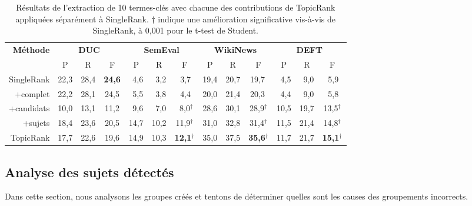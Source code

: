     \begin{table}
      \centering
      \begin{tabular}{@{~}r@{~~}c@{~~}c@{~~}c@{~~}c@{~~}c@{~~}c@{~~}c@{~~}c@{~~}c@{~~}c@{~~}c@{~~}c@{~}}
        \toprule
        \multirow{2}{*}[-2pt]{\textbf{Méthode}} & \multicolumn{3}{c}{\textbf{DUC}} & \multicolumn{3}{c}{\textbf{SemEval}} & \multicolumn{3}{c}{\textbf{WikiNews}} & \multicolumn{3}{c}{\textbf{DEFT}}\\
        \cmidrule(r){2-4}\cmidrule(r){5-7}\cmidrule(r){8-10}\cmidrule{11-13}
        & P & R & F & P & R & F & P & R & F & P & R & F\\
        \midrule
        SingleRank & 22,3 & 28,4 & \textbf{24,6} & $~~$4,6 & $~~$3,2 & $~~$3,7$^{~}$ & 19,4 & 20,7 & 19,7$^{~}$ & $~~$4,5 & $~~$9,0 & $~~$5,9$^{~}$\\
        +complet & 22,2 & 28,1 & 24,5 & $~~$5,5 & $~~$3,8 & $~~$4,4$^{~}$ & 20,0 & 21,4 & 20,3${~}$ & $~~$4,4 & $~~$9,0 & $~~$5,8$^{~}$\\
        +candidats & 10,0 & 13,1 & 11,2 & $~~$9,6 & $~~$7,0 & $~~$8,0$^\dagger$ & 28,6 & 30,1 & 28,9$^\dagger$ & 10,5 & 19,7 & 13,5$^\dagger$\\
        +sujets & 18,4 & 23,6 & 20,5 & 14,7 & 10,2 & 11,9$^\dagger$ & 31,0 & 32,8 & 31,4$^\dagger$ & 11,5 & 21,4 & 14,8$^\dagger$\\
        TopicRank & 17,7 & 22,6 & 19,6 & 14,9 & 10,3 & \textbf{12,1}$^\dagger$ & 35,0 & 37,5 & \textbf{35,6}$^\dagger$ & 11,7 & 21,7 & \textbf{15,1}$^\dagger$\\
        \bottomrule
      \end{tabular}
      \caption{Résultats de l'extraction de 10 termes-clés avec chacune des
               contributions de TopicRank appliquées séparément à SingleRank.
               $\dagger$ indique une amélioration significative vis-à-vis de
               SingleRank, à 0,001 pour le t-test de Student.
               \label{tab:evaluation_individuelle_des_ameliorations}}
    \end{table}

  \subsection{Analyse des sujets détectés}
  \label{subsec:analyse_des_sujets_générés}
    Dans cette section, nous analysons les groupes créés et tentons de
    déterminer quelles sont les causes des groupements incorrects.

